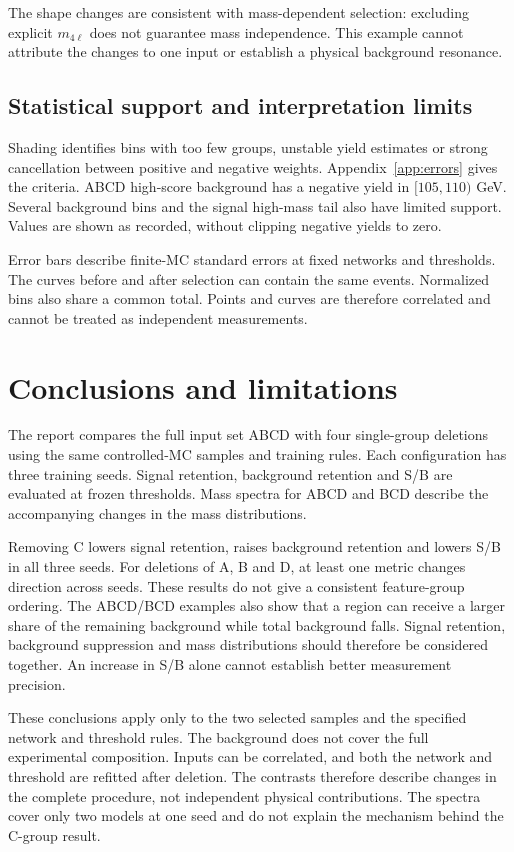 \documentclass[11pt,a4paper]{article}
\begin{document}
The shape changes are consistent with mass-dependent selection: excluding explicit $m_{4\ell}$ does not guarantee mass independence.
This example cannot attribute the changes to one input or establish a physical background resonance.
\FloatBarrier

\subsection{Statistical support and interpretation limits}
Shading identifies bins with too few groups, unstable yield estimates or strong cancellation between positive and negative weights. Appendix~\ref{app:errors} gives the criteria.
ABCD high-score background has a negative yield in $[105,110)$ GeV.
Several background bins and the signal high-mass tail also have limited support.
Values are shown as recorded, without clipping negative yields to zero.

Error bars describe finite-MC standard errors at fixed networks and thresholds.
The curves before and after selection can contain the same events. Normalized bins also share a common total.
Points and curves are therefore correlated and cannot be treated as independent measurements.

\clearpage
\section{Conclusions and limitations}\label{sec:conclusion}
The report compares the full input set ABCD with four single-group deletions using the same controlled-MC samples and training rules. Each configuration has three training seeds.
Signal retention, background retention and S/B are evaluated at frozen thresholds. Mass spectra for ABCD and BCD describe the accompanying changes in the mass distributions.

Removing C lowers signal retention, raises background retention and lowers S/B in all three seeds.
For deletions of A, B and D, at least one metric changes direction across seeds. These results do not give a consistent feature-group ordering.
The ABCD/BCD examples also show that a region can receive a larger share of the remaining background while total background falls.
Signal retention, background suppression and mass distributions should therefore be considered together. An increase in S/B alone cannot establish better measurement precision.

These conclusions apply only to the two selected samples and the specified network and threshold rules.
The background does not cover the full experimental composition.
Inputs can be correlated, and both the network and threshold are refitted after deletion. The contrasts therefore describe changes in the complete procedure, not independent physical contributions.
The spectra cover only two models at one seed and do not explain the mechanism behind the C-group result.
\end{document}
